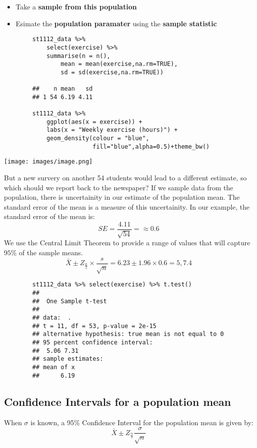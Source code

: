 \documentclass[a4paper, 10pt]{article}
\begin{document}
\begin{examplebox}
    \begin{itemize}
        \item Take a \textbf{sample from this population}
        \item Esimate the \textbf{population paramater} using the \textbf{sample statistic}
    \end{itemize}

    \begin{lstlisting}
        st1112_data %>% 
            select(exercise) %>% 
            summarise(n = n(),
                mean = mean(exercise,na.rm=TRUE),
                sd = sd(exercise,na.rm=TRUE))
        
        ##    n mean   sd
        ## 1 54 6.19 4.11

        st1112_data %>% 
            ggplot(aes(x = exercise)) + 
            labs(x = "Weekly exercise (hours)") +
            geom_density(colour = "blue", 
                         fill="blue",alpha=0.5)+theme_bw()
    \end{lstlisting}
    \begin{center}
        \texttt{[image: images/image.png]}
    \end{center}

    But a new survery on another 54 students would lead to a different estimate, so which should we report back to the newspaper?
    If we sample data from the population, there is uncertainity in our estimate of the population mean.
    The standard error of the mean is a measure of this uncertainity. In our example, the standard error of the mean is:
    $$SE = \frac{4.11}{\sqrt{54}} = \approx 0.6$$
    We use the Central Limit  Theorem to provide a range of values that will capture $95\%$ of the sample means.
    $$\bar{X} \pm Z_{\frac{\alpha}{2}} \times \frac{s}{\sqrt{n}} = 6.23 \pm 1.96 \times 0.6 = 5, 7.4$$
\end{examplebox}

\begin{examplebox}
    \begin{lstlisting}
        st1112_data %>% select(exercise) %>% t.test()
        ## 
        ##  One Sample t-test
        ## 
        ## data:  .
        ## t = 11, df = 53, p-value = 2e-15
        ## alternative hypothesis: true mean is not equal to 0
        ## 95 percent confidence interval:
        ##  5.06 7.31
        ## sample estimates:
        ## mean of x 
        ##      6.19

    \end{lstlisting}
\end{examplebox}

\pagebreak
\subsection{Confidence Intervals for a population mean}
When $\sigma$ is known, a 95\% Confidence Interval for the population mean is given by:
$$\bar{X} \pm Z_{\frac{\alpha}{2}} \frac{\sigma}{\sqrt{n}}$$
\end{document}
